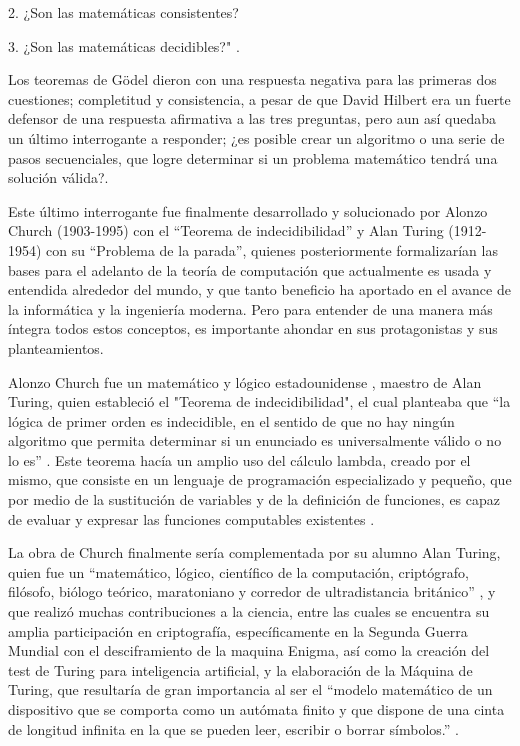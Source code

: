 \documentclass[12pt]{article}
\begin{document}
{ 2.	¿Son las matemáticas consistentes?

 3.	¿Son las matemáticas decidibles?" \citep{TuringWiki}.
\newline

Los teoremas de Gödel dieron con una respuesta negativa para las primeras dos cuestiones; completitud y consistencia, a pesar de que David Hilbert era un fuerte defensor de una respuesta afirmativa a las tres preguntas, pero aun así quedaba un último interrogante a responder; ¿es posible crear un algoritmo o una serie de pasos secuenciales, que logre determinar si un problema matemático tendrá una solución válida?.
\newline

Este último interrogante fue finalmente desarrollado y solucionado por Alonzo Church (1903-1995) con el “Teorema de indecidibilidad” y Alan Turing (1912-1954) con su “Problema de la parada”, quienes posteriormente formalizarían las bases para el adelanto de la teoría de computación que actualmente es usada y entendida alrededor del mundo, y que tanto beneficio ha aportado en el avance de la informática y la ingeniería moderna. Pero para entender de una manera más íntegra todos estos conceptos, es importante ahondar en sus protagonistas y sus planteamientos.
\newline

Alonzo Church fue un matemático y lógico estadounidense \citep{ChurchWiki}, maestro de Alan Turing, quien estableció el "Teorema de indecidibilidad", el cual planteaba que “la lógica de primer orden es indecidible, en el sentido de que no hay ningún algoritmo que permita determinar si un enunciado es universalmente válido o no lo es” \citep{RojasBarba}. Este teorema hacía un amplio uso del cálculo lambda, creado por el mismo, que consiste en un lenguaje de programación especializado y pequeño, que por medio de la sustitución de variables y de la definición de funciones, es capaz de evaluar y expresar las funciones computables existentes \citep{LambdaEcu}.
\newline

La obra de Church finalmente sería complementada por su alumno Alan Turing, quien fue un “matemático, lógico, científico de la computación, criptógrafo, filósofo, biólogo teórico, maratoniano y corredor de ultradistancia británico” \citep{TuringWiki}, y que realizó muchas contribuciones a la ciencia, entre las cuales se encuentra su amplia participación en criptografía, específicamente en la Segunda Guerra Mundial con el desciframiento de la maquina Enigma, así como la creación del test de Turing para inteligencia artificial, y la elaboración de la Máquina de Turing, que resultaría de gran importancia al ser el “modelo matemático de un dispositivo que se comporta como un autómata finito y que dispone de una cinta de longitud infinita en la que se pueden leer, escribir o borrar símbolos.” \citep{Llopismatesfacil}.
\newline

}
\end{document}
